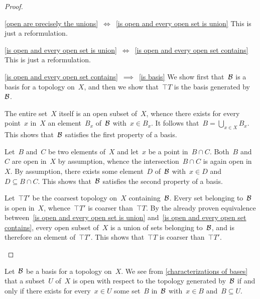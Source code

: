 \begin{proof}
\begin{implicationslist}
		\item[\ref{open are precisely the unions}~$\iff$~\ref{is open and every open set is union}]
			This is just a reformulation.

		\item[\ref{is open and every open set is union}~$\iff$~\ref{is open and every open set contains}]
			This is just a reformulation.

		\item[\ref{is open and every open set contains}~$\implies$~\ref{is basis}]
			We show first that~$\mathcal{B}$ is a basis for a topology on~$X$, and then we show that~$\top{T}$ is the basis generated by~$\mathcal{B}$.

			The entire set~$X$ itself is an open subset of~$X$, whence there exists for every point~$x$ in~$X$ an element~$B_x$ of~$\mathcal{B}$ with~$x ∈ B_x$.
			It follows that~$B = ⋃_{x ∈ X} B_x$.
			This shows that~$\mathcal{B}$ satisfies the first property of a basis.

			Let~$B$ and~$C$ be two elements of~$X$ and let~$x$ be a point in~$B ∩ C$.
			Both~$B$ and~$C$ are open in~$X$ by assumption, whence the intersection~$B ∩ C$ is again open in~$X$.
			By assumption, there exists some element~$D$ of~$\mathcal{B}$ with~$x ∈ D$ and~$D ⊆ B ∩ C$.
			This shows that~$\mathcal{B}$ satisfies the second property of a basis.

			Let~$\top{T}'$ be the coarsest topology on~$X$ containing~$\mathcal{B}$.
			Every set belonging to~$\mathcal{B}$ is open in~$X$, whence~$\top{T}'$ is coarser than~$\top{T}$.
			By the already proven equivalence between~\ref{is open and every open set is union} and~\ref{is open and every open set contains}, every open subset of~$X$ is a union of sets belonging to~$\mathcal{B}$, and is therefore an element of~$\top{T}'$.
			This shows that~$\top{T}$ is coarser than~$\top{T}'$.
		\qedhere

	\end{implicationslist}
\end{proof}

Let~$\mathcal{B}$ be a basis for a topology on~$X$.
We see from \cref{characterizations of bases} that a subset~$U$ of~$X$ is open with respect to the topology generated by~$\mathcal{B}$ if and only if there exists for every~$x ∈ U$ some set~$B$ in~$\mathcal{B}$ with~$x ∈ B$ and~$B ⊆ U$.
